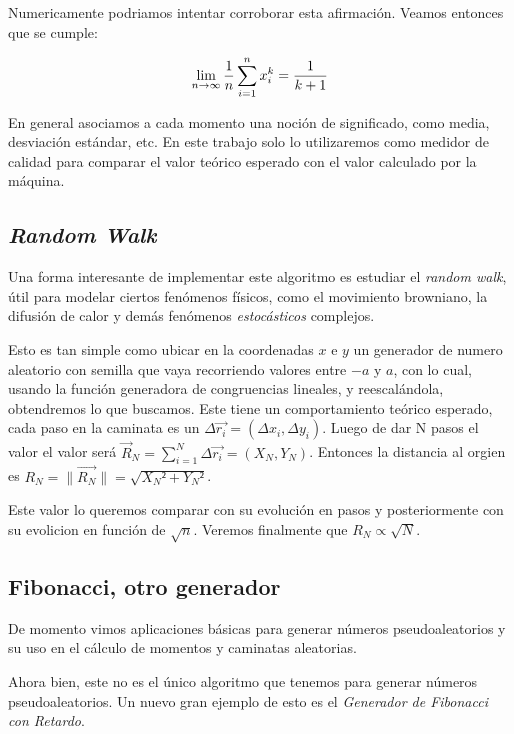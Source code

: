 \documentclass[baaa]{baaa}
\begin{document}
Numericamente podriamos intentar corroborar esta afirmación. Veamos entonces que se cumple: 

\begin{equation}
\centering
\lim_{n \to \infty} \frac{1}{n} \sum_{i=1}^n x_i^k = \frac{1}{k+1}
\end{equation}

En general asociamos a cada momento una noción de significado, como media, desviación estándar, etc. En este trabajo solo lo utilizaremos como medidor de calidad para comparar el valor teórico esperado con el valor calculado por la máquina.

\subsection{\textit{Random Walk}}

Una forma interesante de implementar este algoritmo es estudiar el \textit{random walk}, útil para modelar ciertos fenómenos físicos, como el movimiento browniano, la difusión de calor y demás fenómenos \textit{estocásticos} complejos.

Esto es tan simple como ubicar en la coordenadas $x$ e $y$ un generador de numero aleatorio con semilla que vaya recorriendo valores entre $-a$ y $a$, con lo cual, usando la función generadora de congruencias lineales, y reescalándola, obtendremos lo que buscamos. Este tiene un comportamiento teórico esperado, cada paso en la caminata es un $\Delta \vec{r_i}=(\Delta x_i,\Delta y_i)$. Luego de dar N pasos el valor el valor será $\vec R_N=\sum_{i=1}^{N} \Delta \vec{r_i}=(X_N, Y_N)$. Entonces la distancia al orgien es $R_N = \|\vec {R_N}\|=\sqrt{X_N²+Y_N²}$. 

Este valor lo queremos comparar con su evolución en pasos y posteriormente con su evolicion en función de $\sqrt{n}$. Veremos finalmente que $R_N \propto \sqrt{N}$.

\subsection{Fibonacci, otro generador}

De momento vimos aplicaciones básicas para generar números pseudoaleatorios y su uso en el cálculo de momentos y caminatas aleatorias.

Ahora bien, este no es el único algoritmo que tenemos para generar números pseudoaleatorios. Un nuevo gran ejemplo de esto es el \textit{Generador de Fibonacci con Retardo}.
\end{document}
